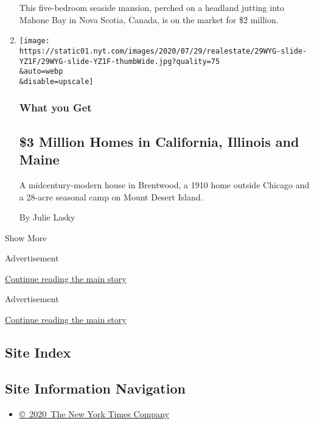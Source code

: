 \begin{enumerate}
  This five-bedroom seaside mansion, perched on a headland jutting into
  Mahone Bay in Nova Scotia, Canada, is on the market for \$2 million.
\item
  \href{/2020/07/29/realestate/2-million-dollar-homes-for-sale-ca-me-il.html}{}

  \texttt{[image: https://static01.nyt.com/images/2020/07/29/realestate/29WYG-slide-YZ1F/29WYG-slide-YZ1F-thumbWide.jpg?quality=75\\\&auto=webp\\\&disable=upscale]}

  \hypertarget{what-you-get-1}{%
  \subsubsection{What you Get}\label{what-you-get-1}}

  \hypertarget{3-million-homes-in-california-illinois-and-maine}{%
  \subsection{\$3 Million Homes in California, Illinois and
  Maine}\label{3-million-homes-in-california-illinois-and-maine}}

  A midcentury-modern house in Brentwood, a 1910 home outside Chicago
  and a 28-acre seasonal camp on Mount Desert Island.

  By Julie Lasky
\end{enumerate}

Show More

Advertisement

\protect\hyperlink{after-mid3}{Continue reading the main story}

Advertisement

\protect\hyperlink{after-mktg}{Continue reading the main story}

\hypertarget{site-index}{%
\subsection{Site Index}\label{site-index}}

\hypertarget{site-information-navigation}{%
\subsection{Site Information
Navigation}\label{site-information-navigation}}

\begin{itemize}
\tightlist
\item
  \href{https://help.nytimes.com/hc/en-us/articles/115014792127-Copyright-notice}{©~2020~The
  New York Times Company}
\end{itemize}


